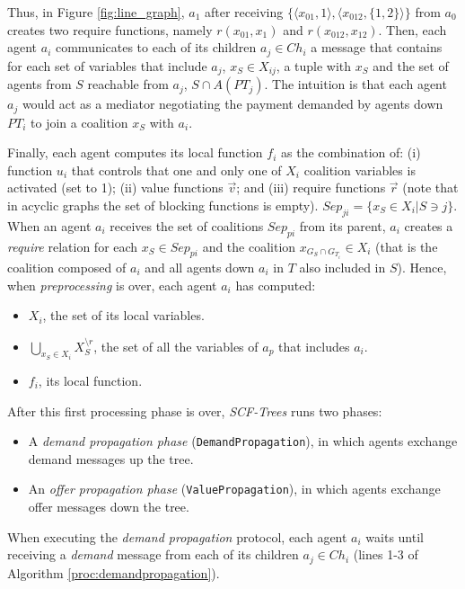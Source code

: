 \documentclass[11pt, twoside, titlepage, a4paper, openright]{report}
\begin{document}
Thus, in Figure
\ref{fig:line_graph}, $a_1$ after receiving $\{\langle
x_{01},{1}\rangle, \langle x_{012} ,\{1,2\}\rangle\}$ from $a_0$ creates two
require functions, namely $r(x_{01},x_{1})$ and $r(x_{012},x_{12})$.
Then, each agent $a_i$ communicates to each of its children $a_j\in Ch_i$ a
message that contains for each set of variables that include $a_j$,
$x_S \in X_{ij}$, a tuple with $x_S$ and the set of agents from $S$ reachable
from $a_j$, $S\cap A(PT_j)$. 
The intuition is that each agent $a_j$ would act as a mediator negotiating the
payment demanded by agents down $PT_i$ to join a coalition $x_S$ with
$a_i$.

Finally, each agent computes its local function $f_i$ as the combination of: (i)
function $u_i$ that controls that one and only one of $X_i$ coalition
variables is activated (set to 1); (ii) value functions $\vec{v}$; and (iii)
require functions $\vec{r}$ (note that in acyclic  graphs the set of
blocking functions is empty).
$Sep_{ji}=\{x_S\in X_i \vert S \ni j\}$.
When an agent $a_i$ receives the set of coalitions $Sep_{pi}$ from its
parent, $a_i$ creates a \emph{require} relation for each $x_S\in Sep_{pi}$
and the coalition $x_{G_S \cap G_{T_i}} \in X_i$ (that is the coalition
composed of $a_i$ and all agents down $a_i$ in $T$ also included in $S$). 
Hence, when \textit{preprocessing} is over, each agent $a_i$ has computed:
\begin{itemize}
\item $X_i$, the set of its local variables.
\item $\bigcup_{x_S\in X_i}X^{\setminus r}_S$, the set of all the variables of $a_p$ that includes $a_i$.
\item $f_i$, its local function.
\end{itemize}

\noindent After this first processing phase is over, \textit{SCF-Trees}
runs two phases:
\begin{itemize}
  \item A \emph{demand propagation phase} (\texttt{DemandPropagation}), in which agents exchange demand messages up the tree.
  \item An \emph{offer propagation phase} (\texttt{ValuePropagation}), in which agents exchange offer messages down the tree.
\end{itemize}

\noindent When executing the \emph{demand propagation} protocol, each agent $a_i$ waits
until receiving a \emph{demand} message from each of its children $a_j \in Ch_i$
(lines 1-3 of Algorithm \ref{proc:demandpropagation}). 
\newpage
\end{document}
